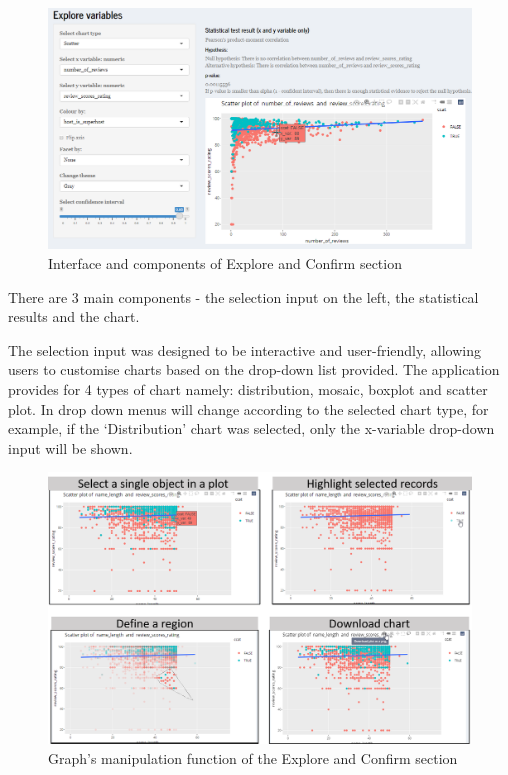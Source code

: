 \documentclass{acm_proc_article-sp}
\begin{document}
\begin{figure}[H]

{\centering \includegraphics[width=1\linewidth]{images/design_explore1} 

}

\caption{Interface and components of Explore and Confirm section}\label{fig:unnamed-chunk-3}
\end{figure}

There are 3 main components - the selection input on the left, the
statistical results and the chart.

The selection input was designed to be interactive and user-friendly,
allowing users to customise charts based on the drop-down list provided.
The application provides for 4 types of chart namely: distribution,
mosaic, boxplot and scatter plot. In drop down menus will change
according to the selected chart type, for example, if the `Distribution'
chart was selected, only the x-variable drop-down input will be shown.

\begin{figure}[H]

{\centering \includegraphics[width=1\linewidth]{images/design_explore2} 

}

\caption{Graph's manipulation function of the Explore and Confirm section}\label{fig:unnamed-chunk-4}
\end{figure}
\end{document}
